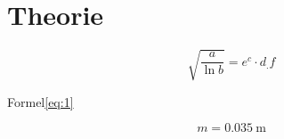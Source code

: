 
\section{Theorie}
\label{sec:Theorie}

\begin{equation}
\sqrt{\frac{a}{\ln{b}}} = e^{c}\cdot d_.f \label{eq:1}
\end{equation}

Formel\eqref{eq:1}

\begin{equation}
m = \SI{0,035}{\metre} \label{eq:m}
\end{equation}